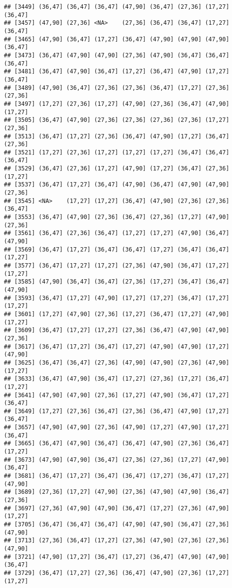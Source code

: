 \documentclass[12pt,]{article}
\begin{document}
\begin{verbatim}
## [3449] (36,47] (36,47] (36,47] (47,90] (36,47] (27,36] (17,27] (36,47]
## [3457] (47,90] (27,36] <NA>    (27,36] (36,47] (36,47] (17,27] (36,47]
## [3465] (47,90] (36,47] (17,27] (36,47] (47,90] (47,90] (47,90] (36,47]
## [3473] (36,47] (47,90] (47,90] (27,36] (47,90] (36,47] (36,47] (36,47]
## [3481] (36,47] (47,90] (36,47] (17,27] (36,47] (47,90] (17,27] (36,47]
## [3489] (47,90] (36,47] (27,36] (27,36] (36,47] (17,27] (27,36] (27,36]
## [3497] (17,27] (27,36] (17,27] (47,90] (27,36] (36,47] (47,90] (17,27]
## [3505] (36,47] (47,90] (27,36] (27,36] (27,36] (27,36] (17,27] (27,36]
## [3513] (36,47] (17,27] (27,36] (36,47] (47,90] (17,27] (36,47] (27,36]
## [3521] (17,27] (27,36] (17,27] (17,27] (17,27] (36,47] (36,47] (36,47]
## [3529] (36,47] (27,36] (17,27] (47,90] (17,27] (36,47] (27,36] (17,27]
## [3537] (36,47] (17,27] (36,47] (47,90] (36,47] (47,90] (47,90] (27,36]
## [3545] <NA>    (17,27] (17,27] (36,47] (47,90] (27,36] (27,36] (36,47]
## [3553] (36,47] (47,90] (27,36] (36,47] (27,36] (17,27] (47,90] (27,36]
## [3561] (36,47] (27,36] (36,47] (17,27] (17,27] (47,90] (36,47] (47,90]
## [3569] (36,47] (17,27] (36,47] (36,47] (17,27] (36,47] (36,47] (17,27]
## [3577] (36,47] (17,27] (17,27] (27,36] (47,90] (36,47] (17,27] (17,27]
## [3585] (47,90] (36,47] (36,47] (27,36] (17,27] (36,47] (36,47] (47,90]
## [3593] (36,47] (17,27] (47,90] (17,27] (17,27] (36,47] (17,27] (17,27]
## [3601] (17,27] (47,90] (27,36] (17,27] (36,47] (17,27] (47,90] (17,27]
## [3609] (36,47] (17,27] (17,27] (27,36] (36,47] (47,90] (47,90] (27,36]
## [3617] (36,47] (17,27] (36,47] (17,27] (47,90] (47,90] (17,27] (47,90]
## [3625] (36,47] (36,47] (27,36] (47,90] (47,90] (27,36] (47,90] (17,27]
## [3633] (36,47] (47,90] (36,47] (17,27] (27,36] (17,27] (36,47] (17,27]
## [3641] (47,90] (47,90] (27,36] (17,27] (47,90] (36,47] (17,27] (36,47]
## [3649] (17,27] (27,36] (36,47] (27,36] (36,47] (47,90] (17,27] (36,47]
## [3657] (47,90] (47,90] (27,36] (47,90] (17,27] (47,90] (17,27] (36,47]
## [3665] (36,47] (47,90] (36,47] (36,47] (47,90] (27,36] (36,47] (17,27]
## [3673] (47,90] (47,90] (36,47] (27,36] (27,36] (17,27] (47,90] (36,47]
## [3681] (36,47] (17,27] (36,47] (36,47] (17,27] (36,47] (17,27] (47,90]
## [3689] (27,36] (17,27] (47,90] (27,36] (47,90] (47,90] (36,47] (27,36]
## [3697] (27,36] (47,90] (47,90] (36,47] (17,27] (27,36] (47,90] (17,27]
## [3705] (36,47] (36,47] (36,47] (47,90] (47,90] (36,47] (27,36] (47,90]
## [3713] (27,36] (36,47] (17,27] (27,36] (47,90] (27,36] (27,36] (47,90]
## [3721] (47,90] (17,27] (36,47] (17,27] (36,47] (47,90] (47,90] (36,47]
## [3729] (36,47] (17,27] (27,36] (36,47] (47,90] (27,36] (17,27] (17,27]

\end{verbatim}
\end{document}
